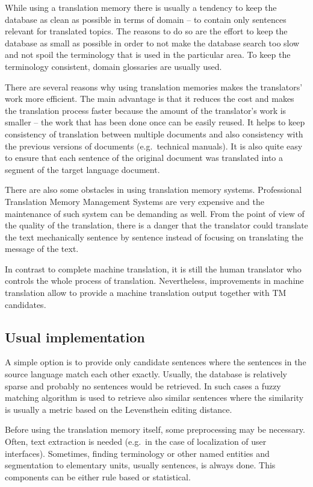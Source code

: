 While using a translation memory there is usually a tendency to keep the database as clean as possible in terms of domain -- to contain only sentences relevant for translated topics. The reasons to do so are the effort to keep the database as small as possible in order to not make the database search too slow and not spoil the terminology that is used in the particular area. To keep the terminology consistent, domain glossaries are usually used.

There are several reasons why using translation memories makes the translators' work more efficient. The main advantage is that it reduces the cost and makes the translation process faster because the amount of the translator's work is smaller -- the work that has been done once can be easily reused. It helps to keep consistency of translation between multiple documents and also consistency with the previous versions of documents (e.g.\ technical manuals). It is also quite easy to ensure that each sentence of the original document was translated into a segment of the target language document.

There are also some obstacles in using translation memory systems. Professional Translation Memory Management Systems are very expensive and the maintenance of such system can be demanding as well. From the point of view of the quality of the translation, there is a danger that the translator could translate the text mechanically sentence by sentence instead of focusing on translating the message of the text.

In contrast to complete machine translation, it is still the human translator who controls the whole process of translation. Nevertheless, improvements in machine translation allow to provide a machine translation output together with TM candidates.

\subsection{Usual implementation}

A simple option is to provide only candidate sentences where the sentences in the source language match  each other exactly. Usually, the database is relatively sparse and probably no sentences would be retrieved. In such cases a fuzzy matching algorithm is used to retrieve also similar sentences where the similarity is usually a metric based on the Levensthein editing distance.

Before using the translation memory itself, some preprocessing may be necessary. Often, text extraction is needed (e.g.\ in the case of localization of user interfaces). Sometimes, finding terminology or other named entities and segmentation to elementary units, usually sentences, is always done. This components can be either rule based or statistical.

